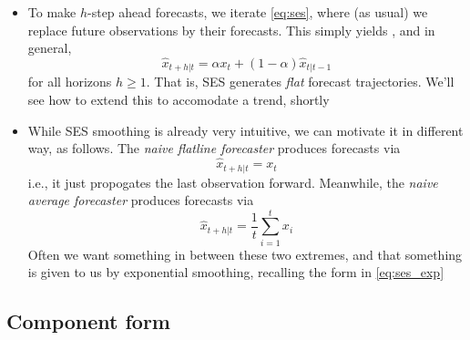 \documentclass{article}
\begin{document}
\begin{itemize}
\item To make $h$-step ahead forecasts, we iterate \eqref{eq:ses}, where (as 
  usual) we replace future observations by their forecasts. This simply  
  yields , and in general, 
  \begin{equation}
  \label{eq:ses_h}
  \hat{x}_{t+h | t} = \alpha x_t + (1-\alpha) \hat{x}_{t | t-1}
  \end{equation}
  for all horizons $h \geq 1$. That is, SES generates \emph{flat} forecast
  trajectories. We'll see how to extend this to accomodate a trend, shortly  

\item While SES smoothing is already very intuitive, we can motivate it in
  different way, as follows. The \emph{naive flatline forecaster} produces
  forecasts via
  \begin{equation}
  \label{eq:flatline_h}
  \hat{x}_{t+h | t} = x_t 
  \end{equation}
  i.e., it just propogates the last observation forward. Meanwhile, the
  \emph{naive average forecaster} produces forecasts via
  \begin{equation}
  \label{eq:average_h}
  \hat{x}_{t+h | t} = \frac{1}{t} \sum_{i=1}^t x_i
  \end{equation}
  Often we want something in between these two extremes, and that something is  
  given to us by exponential smoothing, recalling the form in \eqref{eq:ses_exp} 
\end{itemize}

\subsection{Component form}
\end{document}

